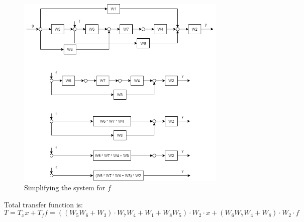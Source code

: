 \documentclass{article}
\begin{document}
\begin{figure}[H]
        \centering
        \includegraphics[width=0.9\textwidth]{sources/image6_2.png}
        \caption{Simplifying the system for $f$}
        \label{fig:tf2}
\end{figure}
Total transfer function is: 
\begin{equation}
	T = T_x x + T_f f = ((W_5 W_6 + W_3) \cdot W_7 W_4 + W_1 + W_8 W_5) \cdot W_2 \cdot x + (W_6 W_7 W_4 + W_8) \cdot W_2 \cdot f
\end{equation}
\end{document}
